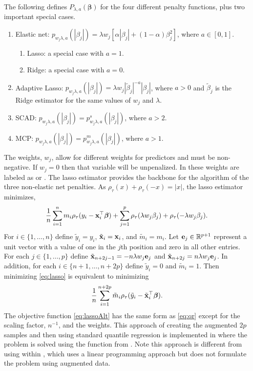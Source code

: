 The following defines \(P_{\lambda,a}(\bm \beta)\) for the four different penalty functions, plus two important special cases.

\begin{enumerate}
\item Elastic net: $p_{w_j\lambda,a}(|\beta_j|) = \lambda w_j \left[ \alpha |\beta_j| +  (1-\alpha) \beta_j^2 \right]$, where $a \in [0,1]$.
\begin{enumerate}
\item Lasso: a special case with $a=1$.
\item Ridge: a special case with $a=0$.
\end{enumerate}
\item Adaptive Lasso: $p_{w_j\lambda,a}(|\beta_j|) = \lambda w_j |\tilde{\beta}_j|^{-a} |\beta_j|$, where $a>0$ and $\tilde{\beta}_j$ is the Ridge estimator for the same values of $w_j$ and $\lambda$.
\item SCAD: $p_{w_j\lambda,a}(|\beta_j|) =  p^s_{w_j\lambda,a}(|\beta_j|)$, where $a>2$.
\item MCP: $p_{w_j\lambda,a}(|\beta_j|) = p^m_{w_j\lambda,a}(|\beta_j|)$, where $a>1$.
\end{enumerate}

The weights, \(w_j\), allow for different weights for predictors and must be non-negative. If \(w_j=0\) then that variable will be unpenalized. In  these weights are labeled as  or . The lasso estimator provides the backbone for the algorithm of the three non-elastic net penalties. As \(\rho_\tau(x)+\rho_\tau(-x) = |x|\), the lasso estimator minimizes,
\begin{equation}
\frac{1}{n} \sum_{i=1}^n m_i \rho_\tau(y_i - {\bf x}_i^\top\bm \beta) +  \sum_{j=1}^p \rho_\tau(\lambda w_j\beta_j)+\rho_\tau(-\lambda w_j\beta_j).
\label{eq:lasso}
\end{equation}
For \(i \in \{1,\ldots,n\}\) define \(\tilde{y}_i = y_i\), \(\tilde{{\bf x}}_i = {\bf x}_i\), and \(\tilde{m}_i = m_i\). Let \({\bf e}_j \in \mathbb{R}^{p+1}\) represent a unit vector with a value of one in the \(j\)th position and zero in all other entries. For each \(j \in \{1,\ldots,p\}\) define \(\tilde{{\bf x}}_{n+2j-1} = -n\lambda w_j {\bf e}_j\) and \(\tilde{{\bf x}}_{n+2j} = n\lambda w_j {\bf e}_j\). In addition, for each \(i \in \{n+1,\ldots,n+2p\}\) define \(\tilde{y}_i = 0\) and \(\tilde{m}_i=1\). Then minimizing \eqref{eq:lasso} is equivalent to minimizing
\begin{equation}
\frac{1}{n} \sum_{i=1}^{n+2p} \tilde{m}_i \rho_\tau(\tilde{y}_i-\tilde{{\bf x}}_i^\top\bm \beta).
\label{eq:lassoAlt}
\end{equation}
The objective function \eqref{eq:lassoAlt} has the same form as \eqref{eq:qr} except for the scaling factor, \(n^{-1}\), and the weights. This approach of creating the augmented \(2p\) samples and then using standard quantile regression is implemented in  where the problem is solved using the  function from . Note this approach is different from using  within , which uses a linear programming approach but does not formulate the problem using augmented data.

